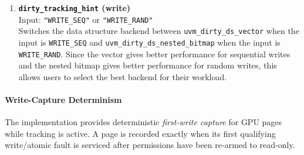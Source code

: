 \begin{enumerate}
    \item \textbf{\texttt{dirty\_tracking\_hint} (write)}\\
          Input: \texttt{"WRITE\_SEQ"} or \texttt{"WRITE\_RAND"}\\
          Switches the data structure backend between \texttt{uvm\_dirty\_ds\_vector}
          when the input is \texttt{WRITE\_SEQ} and \texttt{uvm\_dirty\_ds\_nested\_bitmap} 
          when the input is \texttt{WRITE\_RAND}. Since the vector gives better performance
          for sequential writes and the nested bitmap gives better performance 
          for random writes, this allows users to select the best backend for their workload.\\
      
\end{enumerate}


\paragraph{Write-Capture Determinism}
The implementation provides deterministic \emph{first-write capture} for GPU
pages while tracking is active. A page is recorded exactly when its first
qualifying write/atomic fault is serviced after permissions have been re-armed
to read-only.

